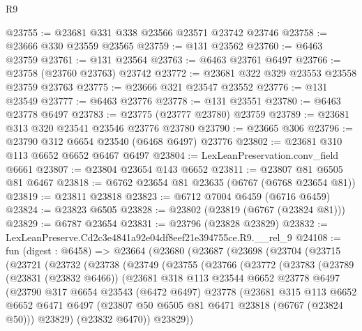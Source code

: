 \begin{lexlean}{R9}
\begin{coremodule}
@23755 := @23681 @331 @338 @23566 @23571 @23742 @23746
@23758 := @23666 @330 @23559 @23565
@23759 := @131 @23562
@23760 := @6463 @23759
@23761 := @131 @23564
@23763 := @6463 @23761 @6497
@23766 := @23758 (@23760 @23763) @23742
@23772 := @23681 @322 @329 @23553 @23558 @23759 @23763
@23775 := @23666 @321 @23547 @23552
@23776 := @131 @23549
@23777 := @6463 @23776
@23778 := @131 @23551
@23780 := @6463 @23778 @6497
@23783 := @23775 (@23777 @23780) @23759
@23789 := @23681 @313 @320 @23541 @23546 @23776 @23780
@23790 := @23665 @306
@23796 := @23790 @312 @6654 @23540 (@6468 @6497) @23776
@23802 := @23681 @310 @113 @6652 @6652 @6467 @6497
@23804 := LexLeanPreservation.conv_field @6661
@23807 := @23804 @23654 @143 @6652
@23811 := @23807 @81 @6505 @81 @6467
@23818 := @6762 @23654 @81 @23635 (@6767 (@6768 @23654 @81))
@23819 := @23811 @23818
@23823 := @6712 @7004 @6459 (@6716 @6459)
@23824 := @23823 @6505
@23828 := @23802 (@23819 (@6767 (@23824 @81)))
@23829 := @6787 @23654
@23831 := @23796 (@23828 @23829)
@23832 := LexLeanPreserve.Cd2c3e4841a92e04df8eef21e394755ce.R9.__rel_9
@24108 := fun (digest : @6458) =>
  @23664
    (@23680
      (@23687
        (@23698
          (@23704
            (@23715
              (@23721
                (@23732
                  (@23738
                    (@23749
                      (@23755
                        (@23766
                          (@23772
                            (@23783
                              (@23789
                                (@23831 (@23832 @6466))
                                (@23681
                                  @318
                                  @113
                                  @23544
                                  @6652
                                  @23778
                                  @6497
                                  (@23790
                                    @317
                                    @6654
                                    @23543
                                    (@6472 @6497)
                                    @23778
                                    (@23681
                                      @315
                                      @113
                                      @6652
                                      @6652
                                      @6471
                                      @6497
                                      (@23807 @50 @6505 @81 @6471 @23818 (@6767 (@23824 @50)))
                                      @23829)
                                    (@23832 @6470))
                                  @23829))

\end{coremodule}
\end{lexlean}
